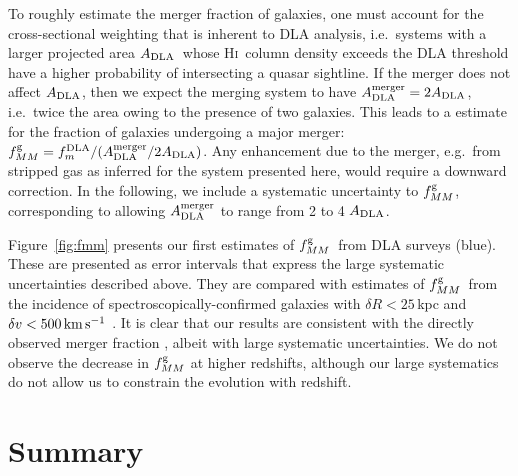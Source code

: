 \documentclass[twocolumn]{aastex62}
\newcommand{\mrperp}{R}
\newcommand{\mfmdla}{f_m^{\rm DLA}}    %
\newcommand{\madla}{A_{\rm DLA}}  %
\newcommand{\adla}{$\madla$}
\newcommand{\mfmg}{f_{MM}^{\rm g}}    %
\newcommand{\fmg}{$\mfmg$}
\newcommand{\mkms}{\rm km \, s^{-1}}
\newcommand{\hi}{H\textsc{i}}
\begin{document}
To roughly estimate the merger fraction of galaxies, one must account for the 
cross-sectional weighting that is inherent to DLA analysis, i.e.\ systems with 
a larger projected area \adla\ whose \hi\ column density exceeds the DLA threshold 
have a higher probability of intersecting a quasar sightline. If the merger does 
not affect \adla, then we expect the merging system to have $\madla^{\rm merger} = 
2 \madla$, i.e.\ twice the area owing to the presence of two galaxies. 
This leads to a estimate for the fraction of galaxies undergoing a major 
merger: $\mfmg = \mfmdla / (\madla^{\rm merger} / 2 \madla)$.
Any enhancement due to the merger, e.g.\ from stripped gas as inferred for the 
system presented here, would require a downward correction. In the following, we 
include a systematic uncertainty to $\mfmg$, corresponding to  allowing 
$\madla^{\rm merger}$ to range from 2 to 4 \adla.


%

Figure~\ref{fig:fmm} presents our first estimates of \fmg\ from DLA surveys (blue).  
These 
are presented as error intervals that express the large systematic uncertainties described 
above. They are compared with estimates of \fmg\ from the incidence of 
spectroscopically-confirmed galaxies with $\delta \mrperp < 25$\,kpc and 
$\delta v < 500 \, \mkms$ \citep[green; ][]{ventou+2017}. It is clear that our 
results are consistent with the directly observed merger fraction \citep{ventou+2019}, 
albeit with large systematic uncertainties. We do not observe the decrease in $\mfmg$ 
at higher redshifts, although our large systematics do not allow us to constrain the 
evolution with redshift.

\section{Summary}
\label{sec:conclude}
\end{document}
